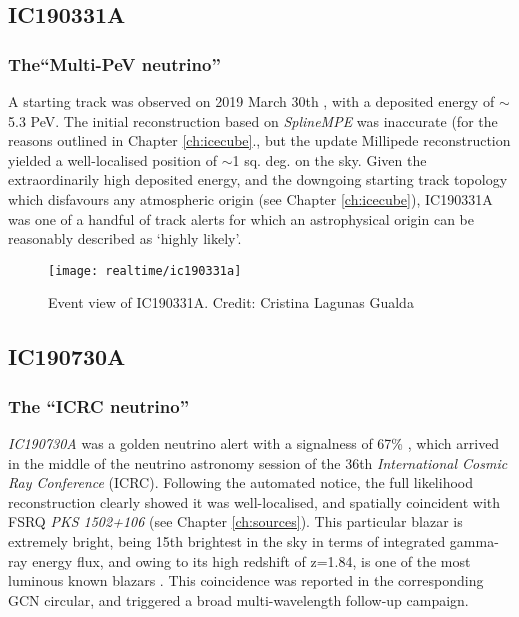 \subsection{IC190331A}
\subsubsection*{The``Multi-PeV neutrino''}

A starting track was observed on 2019 March 30th , with a deposited energy of $\sim$5.3 PeV. The initial reconstruction based on \emph{SplineMPE} was inaccurate (for the reasons outlined in Chapter \ref{ch:icecube}., but the update Millipede reconstruction yielded a well-localised position of $\sim$1 sq. deg. on the sky. Given the extraordinarily high deposited energy, and the downgoing starting track topology which disfavours any atmospheric origin (see Chapter \ref{ch:icecube}), IC190331A was one of a handful of track alerts for which an astrophysical origin can be reasonably described as `highly likely'.

\begin{figure}[!ht]
	\texttt{[image: realtime/ic190331a]}
	\caption{Event view of IC190331A. Credit: Cristina Lagunas Gualda}
	\label{fig:ic190331a}
\end{figure}

\subsection{IC190730A}
\subsubsection*{The ``ICRC neutrino''}

\emph{IC190730A} was a golden neutrino alert with a signalness of 67\% , which arrived in the middle of the neutrino astronomy session of the 36th \emph{International Cosmic Ray Conference} (ICRC). Following the automated notice, the full likelihood reconstruction clearly showed it was well-localised, and spatially coincident with FSRQ \emph{PKS 1502+106} (see Chapter \ref{ch:sources}). This particular blazar is extremely bright, being 15th brightest in the sky in terms of integrated gamma-ray energy flux, and owing to its high redshift of z=1.84, is one of the most luminous known blazars . This coincidence was reported in the corresponding GCN circular, and triggered a broad multi-wavelength follow-up campaign. 

